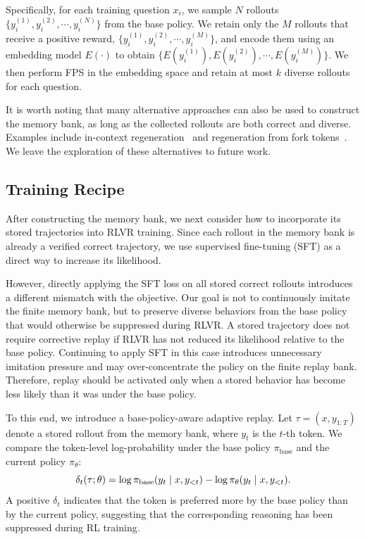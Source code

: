 \documentclass[11pt]{article}
\begin{document}
Specifically, for each training question $x_i$, we sample $N$ rollouts
$\{y_i^{(1)}, y_i^{(2)}, \cdots, y_i^{(N)}\}$
from the base policy. We retain only the $M$ rollouts that receive a positive reward,
$\{y_i^{(1)}, y_i^{(2)}, \cdots, y_i^{(M)}\}$,
and encode them using an embedding model $E(\cdot)$ to obtain
$\{E(y_i^{(1)}), E(y_i^{(2)}), \cdots, E(y_i^{(M)})\}$.
We then perform FPS in the embedding space and retain at most $k$ diverse rollouts for each question.

It is worth noting that many alternative approaches can also be used to construct the memory bank, as long as the collected rollouts are both correct and diverse. Examples include in-context regeneration~\cite{zhang2025noveltybench} and regeneration from fork tokens~\cite{wang2025beyond}. We leave the exploration of these alternatives to future work.

\subsection{Training Recipe}

After constructing the memory bank, we next consider how to incorporate its stored trajectories into RLVR training. Since each rollout in the memory bank is already a verified correct trajectory, we use supervised fine-tuning (SFT) as a direct way to increase its likelihood.

However, directly applying the SFT loss on all stored correct rollouts introduces a different mismatch with the objective. Our goal is not to continuously imitate the finite memory bank, but to preserve diverse behaviors from the base policy that would otherwise be suppressed during RLVR. A stored trajectory does not require corrective replay if RLVR has not reduced its likelihood relative to the base policy. Continuing to apply SFT in this case introduces unnecessary imitation pressure and may over-concentrate the policy on the finite replay bank. Therefore, replay should be activated only when a stored behavior has become less likely than it was under the base policy.

To this end, we introduce a base-policy-aware adaptive replay. Let $\tau=(x,y_{1:T})$ denote a stored rollout from the memory bank, where $y_t$ is the $t$-th token. We compare the token-level log-probability under the base policy $\pi_{\mathrm{base}}$ and the current policy $\pi_\theta$:
\begin{equation}\small\label{eq:delta}
    \delta_t(\tau;\theta)
    =
    \log \pi_{\mathrm{base}}(y_t \mid x,y_{<t})
    -
    \log \pi_\theta(y_t \mid x,y_{<t}).
\end{equation}
A positive $\delta_t$ indicates that the token is preferred more by the base policy than by the current policy, suggesting that the corresponding reasoning has been suppressed during RL training.
\end{document}
